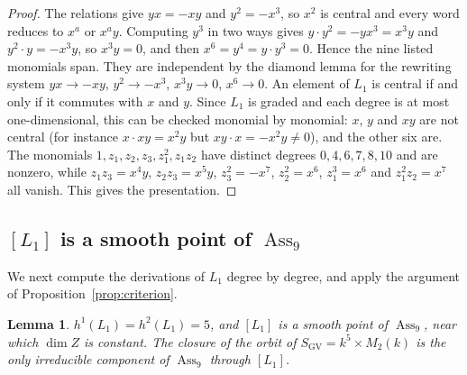 \documentclass[11pt]{amsart}
\numberwithin{table}{section}
\numberwithin{figure}{section}
\numberwithin{equation}{section}
\newtheorem{lem}[thm]{Lemma}
\theoremstyle{definition}
\theoremstyle{plain}
\newcommand{\SGV}{S_{\mathrm{GV}}}
\DeclareMathOperator{\Ass}{Ass}
\begin{document}
\begin{proof}
The relations give $yx = -xy$ and $y^2 = -x^3$, so $x^2$ is central and every word reduces to $x^a$ or $x^a y$. Computing $y^3$ in two ways gives $y\cdot y^2 = -yx^3 = x^3y$ and $y^2\cdot y = -x^3y$, so $x^3y = 0$, and then $x^6 = y^4 = y\cdot y^3 = 0$. Hence the nine listed monomials span. They are independent by the diamond lemma for the rewriting system $yx \to -xy$, $y^2 \to -x^3$, $x^3y \to 0$, $x^6 \to 0$. An element of $L_1$ is central if and only if it commutes with $x$ and $y$. Since $L_1$ is graded and each degree is at most one-dimensional, this can be checked monomial by monomial: $x$, $y$ and $xy$ are not central (for instance $x\cdot xy = x^2y$ but $xy\cdot x = -x^2y \neq 0$), and the other six are. The monomials $1, z_1, z_2, z_3, z_1^2, z_1z_2$ have distinct degrees $0, 4, 6, 7, 8, 10$ and are nonzero, while $z_1z_3 = x^4y$, $z_2z_3 = x^5y$, $z_3^2 = -x^7$, $z_2^2 = x^6$, $z_1^3 = x^6$ and $z_1^2z_2 = x^7$ all vanish. This gives the presentation.
\end{proof}

\subsection{\texorpdfstring{$[L_1]$ is a smooth point of $\Ass_9$}{[L1] is a smooth point of Ass9}}

We next compute the derivations of $L_1$ degree by degree, and apply the argument of Proposition~\ref{prop:criterion}.

\begin{lem}\label{lem:lauferSmooth}
$h^1(L_1) = h^2(L_1) = 5$, and $[L_1]$ is a smooth point of $\Ass_9$, near which $\dim Z$ is constant. The closure of the orbit of $\SGV = k^5 \times M_2(k)$ is the only irreducible component of $\Ass_9$ through $[L_1]$.
\end{lem}
\end{document}
